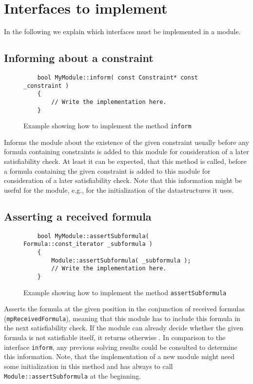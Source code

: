 \section{Interfaces to implement}
In the following we explain which interfaces must be implemented in a module.

\subsection{Informing about a constraint}
\begin{figure}[htb]
\label{fig:exa_inform}
\caption{Example showing how to implement the method \texttt{inform}}
\begin{verbatim}
	bool MyModule::inform( const Constraint* const  _constraint )
	{
	    // Write the implementation here.
	}
\end{verbatim}
\end{figure}
Informs the module about the existence of the given constraint usually before
any formula containing constraints is added to this module for consideration
of a later satisfiability check. At least it can be expected, that this method
is called, before a formula containing the given constraint is added 
to this module for consideration of a later satisfiability check. 
Note that this information might be useful for the module, e.g., for the 
initialization of the datastructures it uses.

\subsection{Asserting a received formula}
\begin{figure}[htb]
\label{fig:exa_assertsubformula}
\caption{Example showing how to implement the method \texttt{assertSubformula}}
\begin{verbatim}
	bool MyModule::assertSubformula( Formula::const_iterator _subformula )
	{
	    Module::assertSubformula( _subformula );
	    // Write the implementation here.
	}
\end{verbatim}
\end{figure}
Asserts the formula at the given position in the conjunction of received formulas 
(\texttt{mpReceivedFormula}), meaning that this module has to include this formula
in the next satisfiability check. If the module
can already decide whether the given formula is not satisfiable itself, it returns \false
otherwise \true. In comparison to the interface \texttt{inform}, any previous solving results
could be consulted to determine this information.
Note, that the implementation of a new module might need some initialization in this method
and has always to call \texttt{Module::assertSubformula} at the beginning.

